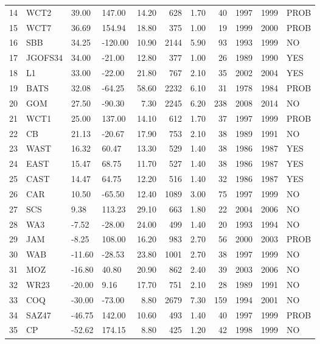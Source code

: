 \documentclass[a4paper]{article}
\begin{document}
\begin{table}
\begin{tabular}{rlllrrrrrrl}
   14 & WCT2 & 39.00 & 147.00 & 14.20 & 628 & 1.70 &  40 & 1997 & 1999 & PROB \\ 
   15 & WCT7 & 36.69 & 154.94 & 18.80 & 375 & 1.00 &  19 & 1999 & 2000 & PROB \\ 
   16 & SBB & 34.25 & -120.00 & 10.90 & 2144 & 5.90 &  93 & 1993 & 1999 & NO \\ 
   17 & JGOFS34 & 34.00 & -21.00 & 12.80 & 377 & 1.00 &  26 & 1989 & 1990 & YES \\ 
   18 & L1 & 33.00 & -22.00 & 21.80 & 767 & 2.10 &  35 & 2002 & 2004 & YES \\ 
   19 & BATS & 32.08 & -64.25 & 58.60 & 2232 & 6.10 &  31 & 1978 & 1984 & PROB \\ 
   20 & GOM & 27.50 & -90.30 & 7.30 & 2245 & 6.20 & 238 & 2008 & 2014 & NO \\ 
   21 & WCT1 & 25.00 & 137.00 & 14.10 & 612 & 1.70 &  37 & 1997 & 1999 & PROB \\ 
   22 & CB & 21.13 & -20.67 & 17.90 & 753 & 2.10 &  38 & 1989 & 1991 & NO \\ 
   23 & WAST & 16.32 & 60.47 & 13.30 & 529 & 1.40 &  38 & 1986 & 1987 & YES \\ 
   24 & EAST & 15.47 & 68.75 & 11.70 & 527 & 1.40 &  38 & 1986 & 1987 & YES \\ 
   25 & CAST & 14.47 & 64.75 & 12.20 & 516 & 1.40 &  32 & 1986 & 1987 & YES \\ 
   26 & CAR & 10.50 & -65.50 & 12.40 & 1089 & 3.00 &  75 & 1997 & 1999 & NO \\ 
   27 & SCS & 9.38 & 113.23 & 29.10 & 663 & 1.80 &  22 & 2004 & 2006 & NO \\ 
   28 & WA3 & -7.52 & -28.00 & 24.00 & 499 & 1.40 &  20 & 1993 & 1994 & NO \\ 
   29 & JAM & -8.25 & 108.00 & 16.20 & 983 & 2.70 &  56 & 2000 & 2003 & PROB \\ 
   30 & WAB & -11.60 & -28.53 & 23.80 & 1001 & 2.70 &  38 & 1997 & 1999 & NO \\ 
   31 & MOZ & -16.80 & 40.80 & 20.90 & 862 & 2.40 &  39 & 2003 & 2006 & NO \\ 
   32 & WR23 & -20.00 & 9.16 & 17.70 & 751 & 2.10 &  28 & 1989 & 1991 & NO \\ 
   33 & COQ & -30.00 & -73.00 & 8.80 & 2679 & 7.30 & 159 & 1994 & 2001 & NO \\ 
   34 & SAZ47 & -46.75 & 142.00 & 10.60 & 493 & 1.40 &  40 & 1997 & 1999 & PROB \\ 
   35 & CP & -52.62 & 174.15 & 8.80 & 425 & 1.20 &  42 & 1998 & 1999 & NO \\ 
   \hline
\end{tabular}
\end{table}
\end{document}
